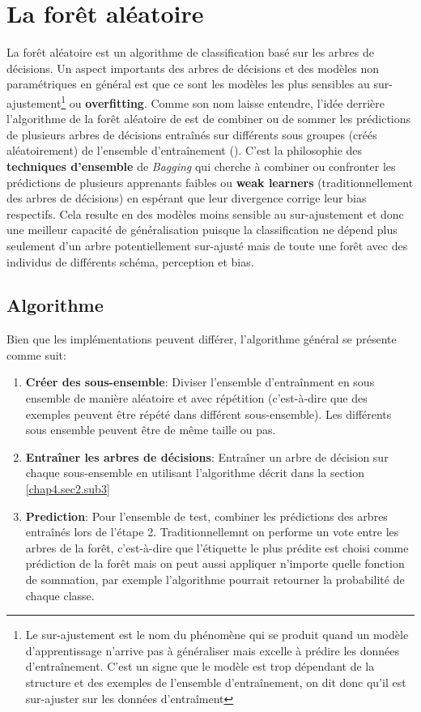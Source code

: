 \section{La forêt aléatoire}
\label{chap4.section3}
La forêt aléatoire est un algorithme de classification basé sur les arbres de décisions. Un aspect importants des arbres de décisions et des modèles non paramétriques en général est que ce sont les modèles les plus sensibles au sur-ajustement\footnote{Le sur-ajustement est le nom du phénomène qui se produit quand un modèle d'apprentissage n'arrive pas à généraliser mais excelle à prédire les données d'entraînement. C'est un signe que le modèle est trop dépendant de la structure et des exemples de l'ensemble d'entraînement, on dit donc qu'il est sur-ajuster sur les données d'entraîment} ou \textbf{overfitting}. Comme son nom laisse entendre, l'idée derrière l'algorithme de la forêt aléatoire de est de combiner ou de sommer les prédictions de plusieurs arbres de décisions entraînés sur différents sous groupes (créés aléatoirement) de l'ensemble d'entraînement (\cite{breiman2001random}). C'est la philosophie des \textbf{techniques d'ensemble} de \textit{Bagging} qui cherche à combiner ou confronter les prédictions de plusieurs apprenants faibles ou \textbf{weak learners} (traditionnellement des arbres de décisions) en espérant que leur divergence corrige leur bias respectifs. Cela resulte en des modèles moins sensible au sur-ajustement et donc une meilleur capacité de généralisation puisque la classification ne dépend plus seulement d'un arbre potentiellement sur-ajusté mais de toute une forêt avec des individus de différents schéma, perception et bias.

\subsection{Algorithme}
\label{chap4.sec3.sub1}
Bien que les implémentations peuvent différer, l'algorithme général se présente comme suit:

\begin{enumerate}
    \item \textbf{Créer des sous-ensemble}: Diviser l'ensemble d'entraînment en sous ensemble de manière aléatoire et avec répétition (c'est-à-dire que des exemples peuvent être répété dans différent sous-ensemble). Les différents sous ensemble peuvent être de même taille ou pas.
    \item \textbf{Entraîner les arbres de décisions}: Entraîner un arbre de décision sur chaque sous-ensemble en utilisant l'algorithme décrit dans la section \ref{chap4.sec2.sub3}
    \item \textbf{Prediction}: Pour l'ensemble de test, combiner les prédictions des arbres entraînés lors de l'étape 2. Traditionnellemnt on performe un vote entre les arbres de la forêt, c'est-à-dire que l'étiquette le plus prédite est choisi comme prédiction de la forêt mais on peut aussi appliquer n'importe quelle fonction de sommation, par exemple l'algorithme pourrait retourner la probabilité de chaque classe.
\end{enumerate}

